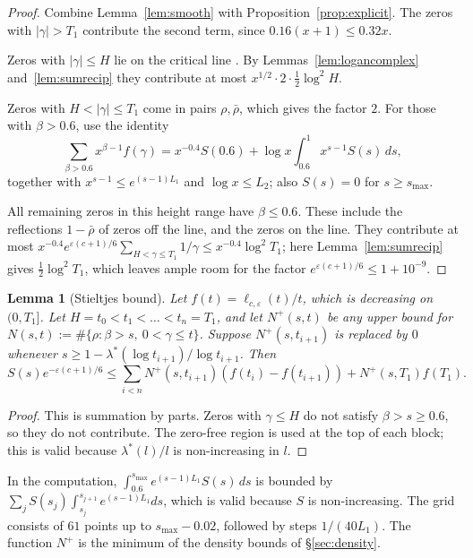 \documentclass[11pt]{amsart}
\numberwithin{equation}{section}
\newtheorem{lemma}[theorem]{Lemma}
\theoremstyle{definition}
\theoremstyle{remark}
\newcommand{\eps}{\varepsilon}
\begin{document}
\begin{proof}
Combine Lemma~\ref{lem:smooth} with Proposition~\ref{prop:explicit}.
The zeros with $|\gamma| > T_1$ contribute the second term, since $0.16(x+1) \le 0.32x$.

Zeros with $|\gamma| \le H$ lie on the critical line \cite{PlattTrudgianRH}.
By Lemmas~\ref{lem:logancomplex} and~\ref{lem:sumrecip} they contribute at most $x^{1/2}\cdot2\cdot\frac12\log^2H$.

Zeros with $H < |\gamma| \le T_1$ come in pairs $\rho,\bar\rho$, which gives the factor $2$.
For those with $\beta > 0.6$, use the identity
\[
\sum_{\beta>0.6} x^{\beta-1}f(\gamma) = x^{-0.4}S(0.6) + \log x\int_{0.6}^1 x^{s-1}S(s)\,ds,
\]
together with $x^{s-1} \le e^{(s-1)L_1}$ and $\log x \le L_2$; also $S(s) = 0$ for $s \ge s_{\max}$.

All remaining zeros in this height range have $\beta \le 0.6$.
These include the reflections $1-\bar\rho$ of zeros off the line, and the zeros on the line.
They contribute at most $x^{-0.4}e^{\eps(c+1)/6}\sum_{H<\gamma\le T_1}1/\gamma \le x^{-0.4}\log^2T_1$; here Lemma~\ref{lem:sumrecip} gives $\frac12\log^2T_1$, which leaves ample room for the factor $e^{\eps(c+1)/6} \le 1 + 10^{-9}$.
\end{proof}

\begin{lemma}[Stieltjes bound]\label{lem:stieltjes}
Let $f(t) = \ell_{c,\eps}(t)/t$, which is decreasing on $(0, T_1]$.
Let $H = t_0 < t_1 < \dots < t_n = T_1$, and let $N^+(s,t)$ be any upper bound for $N(s,t) := \#\{\rho: \beta > s,\ 0<\gamma\le t\}$.
Suppose $N^+(s,t_{i+1})$ is replaced by $0$ whenever $s \ge 1 - \lambda^*(\log t_{i+1})/\log t_{i+1}$. Then
\[
S(s)e^{-\eps(c+1)/6} \le \sum_{i<n} N^+(s, t_{i+1})(f(t_i) - f(t_{i+1})) + N^+(s, T_1)f(T_1).
\]
\end{lemma}

\begin{proof}
This is summation by parts.
Zeros with $\gamma \le H$ do not satisfy $\beta > s \ge 0.6$, so they do not contribute.
The zero-free region is used at the top of each block; this is valid because $\lambda^*(l)/l$ is non-increasing in $l$.
\end{proof}

In the computation, $\int_{0.6}^{s_{\max}}e^{(s-1)L_1}S(s)\,ds$ is bounded by $\sum_j S(s_j)\int_{s_j}^{s_{j+1}}e^{(s-1)L_1}ds$, which is valid because $S$ is non-increasing.
The grid consists of $61$ points up to $s_{\max} - 0.02$, followed by steps $1/(40L_1)$.
The function $N^+$ is the minimum of the density bounds of \S\ref{sec:density}.
\end{document}
